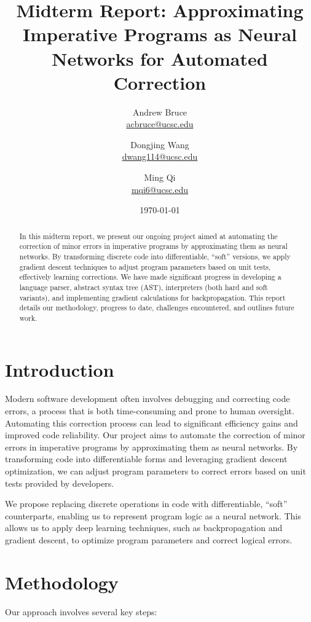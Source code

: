 \documentclass{article}
\title{Midterm Report: Approximating Imperative Programs as Neural Networks for Automated Correction}
\author{Andrew Bruce \\ \href{mailto:acbruce@ucsc.edu}{acbruce@ucsc.edu}
  \and Dongjing Wang \\ \href{mailto:dwang114@ucsc.edu}{dwang114@ucsc.edu}
  \and Ming Qi \\ \href{mailto:mqi6@ucsc.edu}{mqi6@ucsc.edu} }
\date{\today}
\begin{document}
\maketitle

\begin{abstract}
In this midterm report, we present our ongoing project aimed at automating the correction of minor errors in imperative programs by approximating them as neural networks. By transforming discrete code into differentiable, ``soft'' versions, we apply gradient descent techniques to adjust program parameters based on unit tests, effectively learning corrections. We have made significant progress in developing a language parser, abstract syntax tree (AST), interpreters (both hard and soft variants), and implementing gradient calculations for backpropagation. This report details our methodology, progress to date, challenges encountered, and outlines future work.
\end{abstract}

\section{Introduction}

Modern software development often involves debugging and correcting code errors, a process that is both time-consuming and prone to human oversight. Automating this correction process can lead to significant efficiency gains and improved code reliability. Our project aims to automate the correction of minor errors in imperative programs by approximating them as neural networks. By transforming code into differentiable forms and leveraging gradient descent optimization, we can adjust program parameters to correct errors based on unit tests provided by developers.

We propose replacing discrete operations in code with differentiable, ``soft'' counterparts, enabling us to represent program logic as a neural network. This allows us to apply deep learning techniques, such as backpropagation and gradient descent, to optimize program parameters and correct logical errors.

\section{Methodology}

Our approach involves several key steps:
\end{document}
